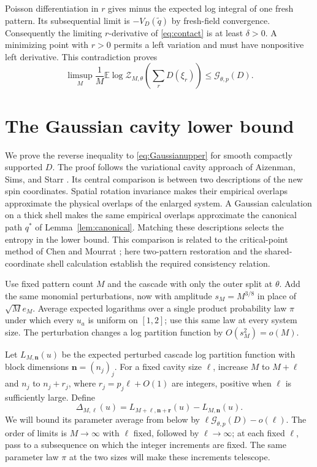 \documentclass[11pt]{article}
\numberwithin{equation}{section}
\theoremstyle{definition}
\newcommand{\E}{\mathbb E}
\newcommand{\Gauss}{\mathcal G}
\newcommand{\calZ}{\mathcal Z}
\begin{document}
Poisson differentiation in $r$ gives minus the expected log integral of one fresh pattern. Its subsequential limit is $-V_D(\widetilde q)$ by fresh-field convergence. Consequently the limiting $r$-derivative of \eqref{eq:contact} is at least $\delta>0$. A minimizing point with $r>0$ permits a left variation and must have nonpositive left derivative. This contradiction proves
\begin{equation}\label{eq:Gaussianupper}
\limsup_M\frac1M\E\log\calZ_{M,\theta}\left(\sum_rD(\xi_r)\right)
\le\Gauss_{\theta,p}(D).
\end{equation}

\section{The Gaussian cavity lower bound}
\label{sec:lower}
We prove the reverse inequality to \eqref{eq:Gaussianupper} for smooth compactly supported $D$. The proof follows the variational cavity approach of Aizenman, Sims, and Starr \cite{AizenmanSimsStarr2003}. Its central comparison is between two descriptions of the new spin coordinates. Spatial rotation invariance makes their empirical overlaps approximate the physical overlaps of the enlarged system. A Gaussian calculation on a thick shell makes the same empirical overlaps approximate the canonical path $q^*$ of Lemma~\ref{lem:canonical}. Matching these descriptions selects the entropy in the lower bound. This comparison is related to the critical-point method of Chen and Mourrat \cite[Sections~6--7]{ChenMourrat2025}; here two-pattern restoration and the shared-coordinate shell calculation establish the required consistency relation.

Use fixed pattern count $M$ and the cascade with only the outer split at $\theta$. Add the same monomial perturbations, now with amplitude $s_M=M^{3/8}$ in place of $\sqrt M e_M$. Average expected logarithms over a single product probability law $\pi$ under which every $u_a$ is uniform on $[1,2]$; use this same law at every system size. The perturbation changes a log partition function by $O(s_M^2)=o(M)$.

Let $L_{M,\boldsymbol n}(u)$ be the expected perturbed cascade log partition function with block dimensions $\boldsymbol n=(n_j)_j$. For a fixed cavity size $\ell$, increase $M$ to $M+\ell$ and $n_j$ to $n_j+r_j$, where $r_j=p_j\ell+O(1)$ are integers, positive when $\ell$ is sufficiently large. Define
\[
\Delta_{M,\ell}(u)=L_{M+\ell,\boldsymbol n+\boldsymbol r}(u)-L_{M,\boldsymbol n}(u).
\]
We will bound its parameter average from below by
$\ell\Gauss_{\theta,p}(D)-o(\ell)$. The order of limits is $M\to\infty$ with $\ell$ fixed, followed by $\ell\to\infty$; at each fixed $\ell$, pass to a subsequence on which the integer increments are fixed. The same parameter law $\pi$ at the two sizes will make these increments telescope.
\end{document}
